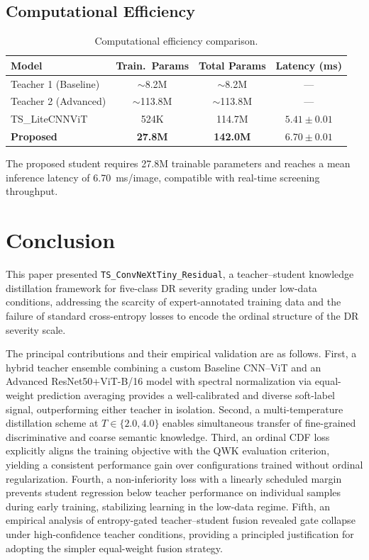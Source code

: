 \documentclass[a4paper,fleqn]{cas-dc}
\begin{document}
\subsection{Computational Efficiency}

\begin{table}[t]
\centering
\caption{Computational efficiency comparison.}
\label{tab:efficiency}
\small
\begin{tabular}{lccc}
\toprule
Model & Train.\ Params & Total Params & Latency (ms) \\
\midrule
Teacher 1 (Baseline) & $\sim$8.2M & $\sim$8.2M & --- \\
Teacher 2 (Advanced) & $\sim$113.8M & $\sim$113.8M & --- \\
TS\_LiteCNNViT & 524K & 114.7M & $5.41 \pm 0.01$ \\
\textbf{Proposed} & \textbf{27.8M} & \textbf{142.0M} & $\mathbf{6.70 \pm 0.01}$ \\
\bottomrule
\end{tabular}
\end{table}

The proposed student requires 27.8M trainable parameters and reaches a mean inference latency of 6.70~ms/image, compatible with real-time screening throughput.

\section{Conclusion}
\label{sec:conclusion}

This paper presented \texttt{TS\_ConvNeXtTiny\_Residual}, a teacher--student knowledge distillation framework for five-class DR severity grading under low-data conditions, addressing the scarcity of expert-annotated training data and the failure of standard cross-entropy losses to encode the ordinal structure of the DR severity scale.

The principal contributions and their empirical validation are as follows. First, a hybrid teacher ensemble combining a custom Baseline CNN--ViT and an Advanced ResNet50+ViT-B/16 model with spectral normalization via equal-weight prediction averaging provides a well-calibrated and diverse soft-label signal, outperforming either teacher in isolation. Second, a multi-temperature distillation scheme at $T \in \{2.0, 4.0\}$ enables simultaneous transfer of fine-grained discriminative and coarse semantic knowledge. Third, an ordinal CDF loss explicitly aligns the training objective with the QWK evaluation criterion, yielding a consistent performance gain over configurations trained without ordinal regularization. Fourth, a non-inferiority loss with a linearly scheduled margin prevents student regression below teacher performance on individual samples during early training, stabilizing learning in the low-data regime. Fifth, an empirical analysis of entropy-gated teacher--student fusion revealed gate collapse under high-confidence teacher conditions, providing a principled justification for adopting the simpler equal-weight fusion strategy.
\end{document}

